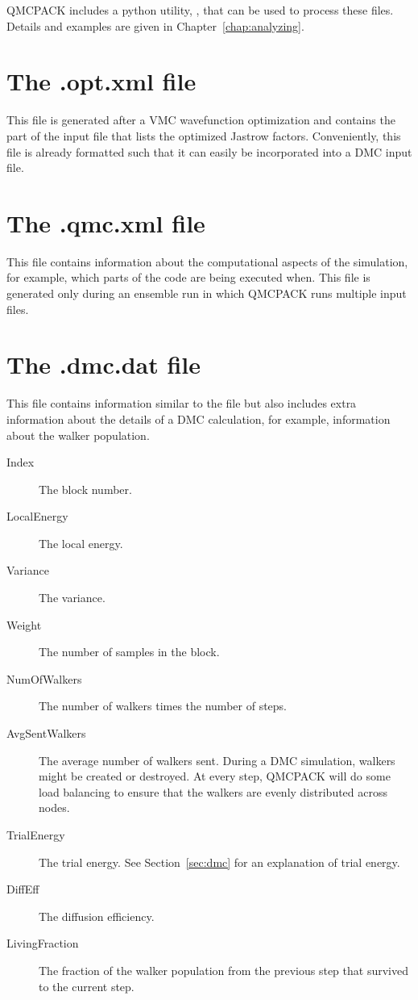 QMCPACK includes a python utility, , that can be used to process these files. Details and examples are given in Chapter~\ref{chap:analyzing}.
\section{The .opt.xml file}
\label{sec:optxml_file}
This file is generated after a VMC wavefunction optimization and contains the part of the input file that lists the optimized Jastrow factors.
Conveniently, this file is already formatted such that it can easily be incorporated into a DMC input file.

\section{The .qmc.xml file}
\label{sec:qmc_file}
This file contains information about the computational aspects of the simulation, for example, which parts of the code are being executed when. This file is generated only during an ensemble run in which QMCPACK runs multiple input files.

\section{The .dmc.dat file}
\label{sec:dmc_file}
This file contains information similar to the  file but also includes extra information about the details of a DMC calculation, for example, information about the walker population.

\begin{description}
\item[Index] The block number.
\item[LocalEnergy] The local energy.
\item[Variance] The variance.
\item[Weight] The number of samples in the block.
\item[NumOfWalkers] The number of walkers times the number of steps.
\item[AvgSentWalkers] The average number of walkers sent. During a DMC simulation, walkers might be created or destroyed. At every step, QMCPACK will do some load balancing to ensure that the walkers are evenly distributed across nodes.
\item[TrialEnergy] The trial energy. See Section~\ref{sec:dmc} for an explanation of trial energy.
\item[DiffEff] The diffusion efficiency.
\item[LivingFraction] The fraction of the walker population from the previous step that survived to the current step.
\end{description}


